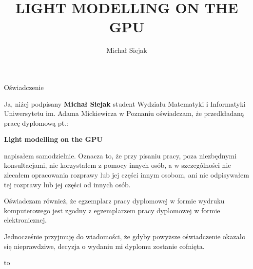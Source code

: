 \documentclass[twoside,openright,a4paper,12pt]{memoir}
\theoremstyle{definition}
\begin{document}
\title{LIGHT MODELLING ON THE GPU}
\author{Michał Siejak}

\frontmatter
{}
\maketitle
\newpage
{}
\setcounter{page}{2}

\begin{center}
  \LARGE{Oświadczenie}
\end{center}

Ja, niżej podpisany \textbf{Michał Siejak} student Wydziału
Matematyki i Informatyki Uniwersytetu im. Adama Mickiewicza w Poznaniu
oświadczam, że przedkładaną pracę dyplomową pt.:

\centerline{\textbf{Light modelling on the GPU}}

napisałem samodzielnie. Oznacza to, że przy pisaniu pracy, poza niezbędnymi
konsultacjami, nie korzystałem z pomocy innych osób, a w szczególności nie
zlecałem opracowania rozprawy lub jej części innym osobom, ani nie
odpisywałem tej rozprawy lub jej części od innych osób.

Oświadczam również, że egzemplarz pracy dyplomowej w formie wydruku
komputerowego jest zgodny z egzemplarzem pracy dyplomowej w formie
elektronicznej.

Jednocześnie przyjmuję do wiadomości, że gdyby powyższe oświadczenie
okazało się nieprawdziwe, decyzja o wydaniu mi dyplomu zostanie cofnięta.

\newcommand{\kropki}[2]{%
  \vbox{%
    \hbox to #1{\dotfill}%
    \vspace{4pt}%
    \hbox to #1{\hss #2\hss}%
  }
}
\vspace{1cm}
\hbox to \textwidth{%
  \hfil
  \kropki{4cm}{data}%
  \hfil\hfil
  \kropki{4cm}{podpis}%
  \hfil
}
\newpage

\begin{abstract}
\end{abstract}
\newpage

\tableofcontents*

\mainmatter








\backmatter
\printbibliography
\end{document}
